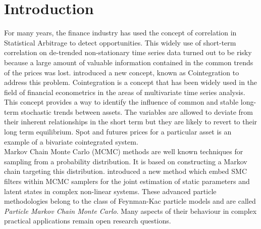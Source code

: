 \documentclass[11pt,a4,twosided,singlespacing,titlepagenumber=on]{scrreprt}
\numberwithin{equation}{chapter} %
\theoremstyle{remark}
\begin{document}

\chapter{Introduction}

For many years, the finance industry has used the concept of correlation in Statistical Arbitrage to detect opportunities. This widely use of short-term correlation on de-trended non-stationary time series data turned out to be risky because a large amount of valuable information contained in the common trends of the prices was lost. \cite{engle1987} introduced a new concept, known as Cointegration to address this problem. Cointegration is a concept that has been widely used in the field of financial econometrics in the areas of multivariate time series analysis. This concept provides a way to identify the influence of common and stable long-term stochastic trends between assets. The variables are allowed to deviate from their inherent relationships in the short term but they are likely to revert to their long term equilibrium. Spot and futures prices for a particular asset is an example of a bivariate cointegrated system. \\


Markov Chain Monte Carlo (MCMC) methods are well known techniques for sampling from a probability distribution. It is based on constructing a Markov chain targeting this distribution. \cite{andrieu2010} introduced a new method which embed SMC filters within MCMC samplers for the joint estimation of static parameters and latent states in complex non-linear systems. These advanced particle methodologies belong to the class of Feynman-Kac particle models and are called \textit{Particle Markov Chain Monte Carlo}. Many aspects of their behaviour in complex practical applications remain open research questions. \\
\end{document}
